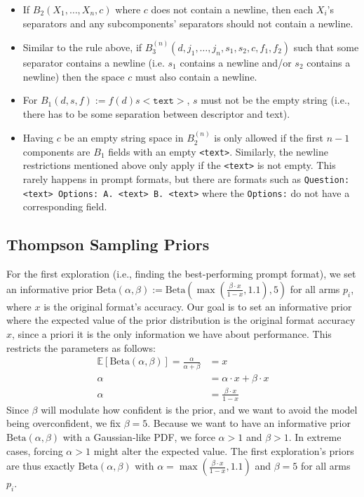 \documentclass{article} %
\begin{document}
\begin{itemize}
    \item If $B_2(X_1,\!\ldots,\!X_n,\!c)$ where $c$ does not contain a newline, then each $X_i$'s separators and any subcomponents' separators should not contain a newline.
    \item Similar to the rule above, if $B_3^{(n)}(d,j_1,\ldots,j_n, s_1, s_2, c, f_1, f_2)$ such that some separator contains a newline (i.e. $s_1$ contains a newline and/or $s_2$ contains a newline) then the space $c$ must also contain a newline. %
    \item For $B_1(d,s,f):=f(d)s\mathtt{<text>}$, $s$ must not be the empty string (i.e., there has to be some separation between descriptor and text).
    \item Having $c$ be an empty string space in $B_2^{(n)}$ is only allowed if the first $n-1$ components are $B_1$ fields with an empty \texttt{<text>}. Similarly, the newline restrictions mentioned above only apply if the \texttt{<text>} is not empty. This rarely happens in prompt formats, but there are formats such as \texttt{Question: <text> Options: A. <text> B. <text>} where the \texttt{Options:} do not have a corresponding field.
\end{itemize}

\subsection{Thompson Sampling Priors}\label{app:informative_priors}
For the first exploration (i.e., finding the best-performing prompt format), we set an informative prior $\text{Beta}(\alpha, \beta):=\text{Beta}\left(\max\left(\frac{\beta \cdot x}{1 - x}, 1.1\right), 5\right)$ for all arms $p_i$, where $x$ is the original format's accuracy. %
Our goal is to set an informative prior where the expected value of the prior distribution is the original format accuracy $x$, since a priori it is the only information we have about performance. This restricts the parameters as follows:
\begin{align*}
    \mathds{E}[\text{Beta}(\alpha, \beta)] = \frac{\alpha}{\alpha+\beta} &= x\\
    \alpha &= \alpha\cdot x + \beta\cdot x \\
    \alpha &= \frac{\beta \cdot x}{1 - x}
\end{align*}
Since $\beta$ will modulate how confident is the prior, and we want to avoid the model being overconfident, we fix $\beta=5$. Because we want to have an informative prior $\text{Beta}(\alpha, \beta)$ with a Gaussian-like PDF, we force $\alpha > 1$ and $\beta > 1$. In extreme cases, forcing $\alpha > 1$ might alter the expected value.
The first exploration's priors are thus exactly $\text{Beta}(\alpha, \beta)$ with $\alpha = \max\left(\frac{\beta \cdot x}{1 - x}, 1.1\right)$ and $\beta = 5$ for all arms $p_i$. 
\end{document}
